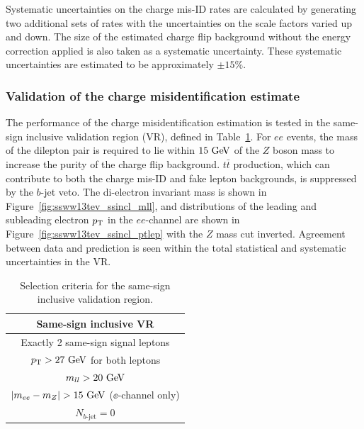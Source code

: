 Systematic uncertainties on the charge mis-ID rates are calculated by generating two additional sets of rates with the uncertainties on the scale factors varied up and down.
The size of the estimated charge flip background without the energy correction applied is also taken as a systematic uncertainty.
These systematic uncertainties are estimated to be approximately $\pm 15\%$.

\subsubsection{Validation of the charge misidentification estimate}\label{ssww13tev:ssincl_vr}

The performance of the charge misidentification estimation is tested in the same-sign inclusive validation region (VR), defined in Table~\ref{tab:ssww13tev_ssincl_vr_def}.
For $ee$ events, the mass of the dilepton pair is required to lie within $15\gev$ of the $Z$ boson mass to increase the purity of the charge flip background.
$t\bar{t}$ production, which can contribute to both the charge mis-ID and fake lepton backgrounds, is suppressed by the $b$-jet veto.
The di-electron invariant mass is shown in Figure~\ref{fig:ssww13tev_ssincl_mll}, and distributions of the leading and subleading electron $p_{\mathrm{T}}$ in the $ee$-channel are shown in Figure~\ref{fig:ssww13tev_ssincl_ptlep} with the $Z$ mass cut inverted.
Agreement between data and prediction is seen within the total statistical and systematic uncertainties in the VR.

\begin{table}[htbp]
  \centering
  \begin{tabular}{c}
    Same-sign inclusive VR \\
    \hline\hline
    Exactly 2 same-sign signal leptons\\
    $\pt > 27\gev$ for both leptons \\
    $m_{ll} > 20\gev$\\
    $|m_{ee} - m_Z| > 15\gev$ ($\ee$-channel only) \\
    $N_{b\textrm{-jet}} = 0$\\
    \hline
  \end{tabular}
  \caption{Selection criteria for the same-sign inclusive validation region.}
  \label{tab:ssww13tev_ssincl_vr_def}
\end{table}

